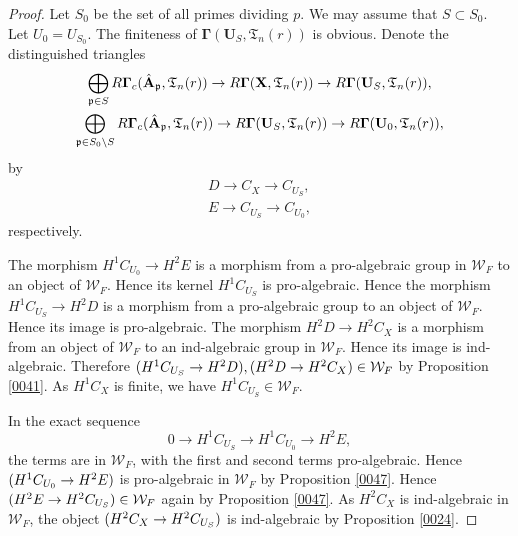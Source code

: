 \documentclass{amsart}
\theoremstyle{remark}
\numberwithin{equation}{section}
\newcommand{\alg}[1]{\mathbf{#1}}
\newcommand{\ideal}[1]{\mathfrak{#1}}
\let\Im\relax
\DeclareMathOperator{\Im}{Im}
\begin{document}
\begin{proof}
	Let $S_{0}$ be the set of all primes dividing $p$.
	We may assume that $S \subset S_{0}$.
	Let $U_{0} = U_{S_{0}}$.
	The finiteness of $\alg{\Gamma}(\alg{U}_{S}, \mathfrak{T}_{n}(r))$ is obvious.
	Denote the distinguished triangles
		\begin{gather*}
					\bigoplus_{\ideal{p} \in S}
						R \alg{\Gamma}_{c}(\Hat{\alg{A}}_{\ideal{p}}, \mathfrak{T}_{n}(r))
				\to
					R \alg{\Gamma}(\alg{X}, \mathfrak{T}_{n}(r))
				\to
					R \alg{\Gamma}(\alg{U}_{S}, \mathfrak{T}_{n}(r)),
			\\
					\bigoplus_{\ideal{p} \in S_{0} \setminus S}
						R \alg{\Gamma}_{c}(\Hat{\alg{A}}_{\ideal{p}}, \mathfrak{T}_{n}(r))
				\to
					R \alg{\Gamma}(\alg{U}_{S}, \mathfrak{T}_{n}(r))
				\to
					R \alg{\Gamma}(\alg{U}_{0}, \mathfrak{T}_{n}(r)),
		\end{gather*}
	by
		\begin{gather*}
					D
				\to
					C_{X}
				\to
					C_{U_{S}},
			\\
					E
				\to
					C_{U_{S}}
				\to
					C_{U_{0}},
		\end{gather*}
	respectively.
	
	The morphism $H^{1} C_{U_{0}} \to H^{2} E$ is a morphism
	from a pro-algebraic group in $\mathcal{W}_{F}$
	to an object of $\mathcal{W}_{F}$.
	Hence its kernel $H^{1} C_{U_{S}}$ is pro-algebraic.
	Hence the morphism $H^{1} C_{U_{S}} \to H^{2} D$ is a morphism
	from a pro-algebraic group to an object of $\mathcal{W}_{F}$.
	Hence its image is pro-algebraic.
	The morphism $H^{2} D \to H^{2} C_{X}$ is a morphism
	from an object of $\mathcal{W}_{F}$ to an ind-algebraic group in $\mathcal{W}_{F}$.
	Hence its image is ind-algebraic.
	Therefore $\Im(H^{1} C_{U_{S}} \to H^{2} D), \Im(H^{2} D \to H^{2} C_{X}) \in \mathcal{W}_{F}$
	by Proposition \ref{0041}.
	As $H^{1} C_{X}$ is finite, we have $H^{1} C_{U_{S}} \in \mathcal{W}_{F}$.
	
	In the exact sequence
		\[
				0
			\to
				H^{1} C_{U_{S}}
			\to
				H^{1} C_{U_{0}}
			\to
				H^{2} E,
		\]
	the terms are in $\mathcal{W}_{F}$, with the first and second terms pro-algebraic.
	Hence $\Im(H^{1} C_{U_{0}} \to H^{2} E)$ is pro-algebraic in $\mathcal{W}_{F}$
	by Proposition \ref{0047}.
	Hence $\Im(H^{2} E \to H^{2} C_{U_{S}}) \in \mathcal{W}_{F}$
	again by Proposition \ref{0047}.
	As $H^{2} C_{X}$ is ind-algebraic in $\mathcal{W}_{F}$,
	the object $\Im(H^{2} C_{X} \to H^{2} C_{U_{S}})$ is ind-algebraic
	by Proposition \ref{0024}.
	

\end{proof}
\end{document}
